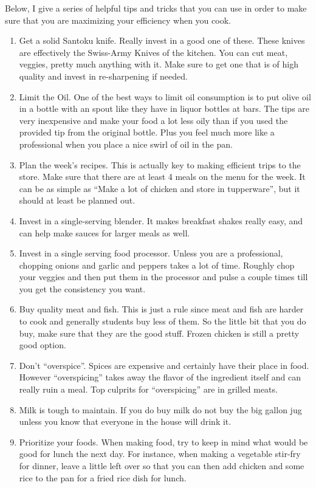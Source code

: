 

Below, I give a series of helpful tips and tricks that you can use in order to make sure that you are maximizing your efficiency when you cook. 

\begin{enumerate}
\item Get a solid Santoku knife. Really invest in a good one of these. These knives are effectively the Swiss-Army Knives of the kitchen. You can cut meat, veggies, pretty much anything with it. Make sure to get one that is of high quality and invest in re-sharpening if needed.
\item Limit the Oil. One of the best ways to limit oil consumption is to put olive oil in a bottle with an spout like they have in liquor bottles at bars. The tips are very inexpensive and make your food a lot less oily than if you used the provided tip from the original bottle. Plus you feel much more like a professional when you place a nice swirl of oil in the pan. 
\item Plan the week's recipes. This is actually key to making efficient trips to the store. Make sure that there are at least 4 meals on the menu for the week. It can be as simple as ``Make a lot of chicken and store in tupperware'', but it should at least be planned out. 
\item Invest in a single-serving blender. It makes breakfast shakes really easy, and can help make sauces for larger meals as well.
\item Invest in a single serving food processor. Unless you are a professional, chopping onions and garlic and peppers takes a lot of time. Roughly chop your veggies and then put them in the processor and pulse a couple times till you get the consistency you want. 
\item Buy quality meat and fish. This is just a rule since meat and fish are harder to cook and generally students buy less of them. So the little bit that you do buy, make sure that they are the good stuff. Frozen chicken is still a pretty good option. 
\item Don't ``overspice''. Spices are expensive and certainly have their place in food. However ``overspicing'' takes away the flavor of the ingredient itself and can really ruin a meal. Top culprits for ``overspicing'' are in grilled meats. 
\item Milk is tough to maintain. If you do buy milk do not buy the big gallon jug unless you know that everyone in the house will drink it. 
\item Prioritize your foods. When making food, try to keep in mind what would be good for lunch the next day. For instance, when making a vegetable stir-fry for dinner, leave a little left over so that you can then add chicken and some rice to the pan for a fried rice dish for lunch. 
\end{enumerate}
